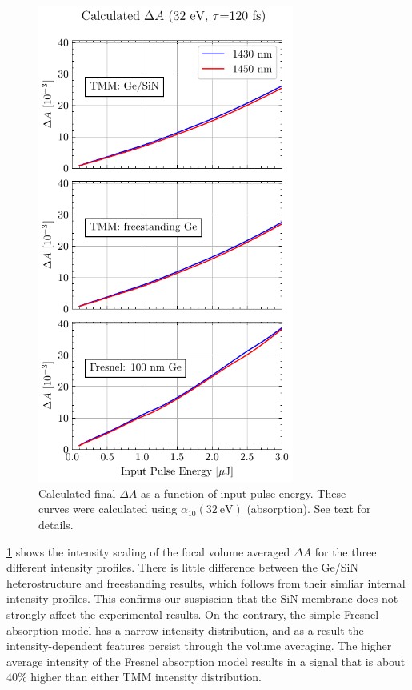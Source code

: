\begin{figure}
	\centering
	\includegraphics[width=0.75\textwidth]{figures/chap4/FVA_XUV_signal.pdf}
	\caption{Calculated final $\Delta A$ as a function of input pulse energy. These curves were calculated using $\alpha_{10}(32 \ \textrm{eV})$ (absorption). See text for details.}
	\label{fig:FVA_XUV_signal}
\end{figure}

\cref{fig:FVA_XUV_signal} shows the intensity scaling of the focal volume averaged $\Delta A$ for the three different intensity profiles. There is little difference between the Ge/SiN heterostructure and freestanding results, which follows from their simliar internal intensity profiles. This confirms our suspiscion that the SiN membrane does not strongly affect the experimental results. On the contrary, the simple Fresnel absorption model has a narrow intensity distribution, and as a result the intensity-dependent features persist through the volume averaging. The higher average intensity of the Fresnel absorption model results in a signal that is about 40\% higher than either TMM intensity distribution.

